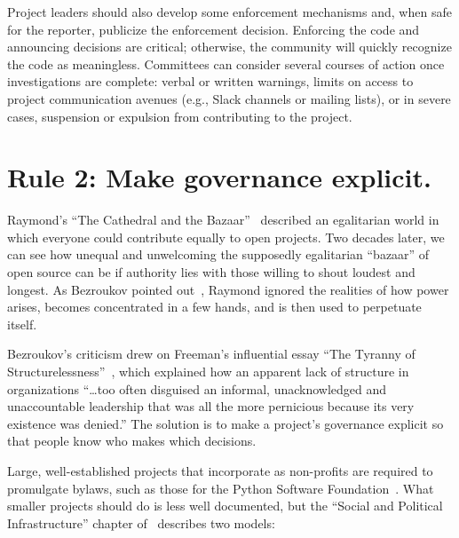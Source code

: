 \documentclass[10pt,letterpaper]{article}
\newcommand{\rulemajor}[1]{\section*{#1}}
\begin{document}
Project leaders should also develop some enforcement mechanisms and,
when safe for the reporter,
publicize the enforcement decision.
Enforcing the code and announcing decisions are critical;
otherwise,
the community will quickly recognize the code as meaningless.
Committees can consider several courses of action once investigations are complete:
verbal or written warnings,
limits on access to project communication avenues (e.g., Slack channels or mailing lists),
or in severe cases,
suspension or expulsion from contributing to the project.

\rulemajor{Rule 2: Make governance explicit.}

Raymond's ``The Cathedral and the Bazaar''~\cite{raymond2001}
described an egalitarian world in which everyone could contribute equally to open projects.
Two decades later,
we can see how unequal and unwelcoming the supposedly egalitarian ``bazaar'' of open source can be
if authority lies with those willing to shout loudest and longest.
As Bezroukov pointed out~\cite{bezroukov1999},
Raymond ignored the realities of how power arises,
becomes concentrated in a few hands,
and is then used to perpetuate itself.

Bezroukov's criticism drew on Freeman's influential essay ``The Tyranny of Structurelessness''~\cite{freeman1972},
which explained how an apparent lack of structure in organizations ``{\ldots}too often disguised an informal,
unacknowledged and unaccountable leadership that was all the more pernicious because its very existence was denied.''
The solution is to make a project's governance explicit
so that people know who makes which decisions.

Large, well-established projects that incorporate as non-profits are required to promulgate bylaws,
such as those for the Python Software Foundation~\cite{psf-bylaws}.
What smaller projects should do is less well documented,
but the ``Social and Political Infrastructure'' chapter of~\cite{fogel2005}
describes two models:
\end{document}
